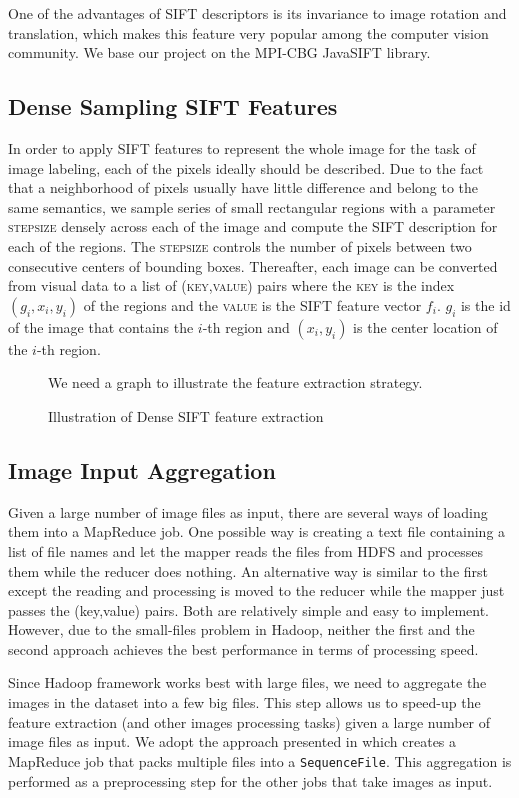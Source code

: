 \documentclass{acm_proc_article-sp}
\begin{document}
One of the advantages of SIFT descriptors is its invariance to image rotation and translation, which makes this feature very popular among the computer vision community. We base our project on the MPI-CBG JavaSIFT library\cite{mpicbg}.
\subsection{Dense Sampling SIFT Features}
In order to apply SIFT features to represent the whole image for the task of image labeling, each of the pixels ideally should be described. Due to the fact that a neighborhood of pixels usually have little difference and belong to the same semantics, we sample series of small rectangular regions with a parameter \textsc{stepsize} densely across each of the image and compute the SIFT description for each of the regions. The \textsc{stepsize} controls the number of pixels between two consecutive centers of bounding boxes. Thereafter, each image can be converted from visual data to a list of \textsc{(key,value)} pairs where the \textsc{key} is the index $(g_i,x_i,y_i)$ of the regions and the \textsc{value} is the SIFT feature vector $f_i$. $g_i$ is the id of the image that contains the $i$-th region and $(x_i,y_i)$ is the center location of the $i$-th region.

\begin{figure}[!htb]
 \centering
 We need a graph to illustrate the feature extraction strategy.
 \caption{Illustration of Dense SIFT feature extraction}
\end{figure}

\subsection{Image Input Aggregation}
Given a large number of image files as input, there are several ways of loading them into a MapReduce job. One possible way is creating a text file containing a list of file names and let the mapper reads the files from HDFS and processes them while the reducer does nothing. An alternative way is similar to the first except the reading and processing is moved to the reducer while the mapper just passes the (key,value) pairs. Both are relatively simple and easy to implement. However, due to the small-files problem in Hadoop\cite{smallfiles}, neither the first and the second approach achieves the best performance in terms of processing speed. 

Since Hadoop framework works best with large files, we need to aggregate the images in the dataset into a few big files. This step allows us to speed-up the feature extraction (and other images processing tasks) given a large number of image files as input. We adopt the approach presented in\cite{combinefiles} which creates a MapReduce job that packs multiple files into a \texttt{SequenceFile}. This aggregation is performed as a preprocessing step for the other jobs that take images as input.
\end{document}
